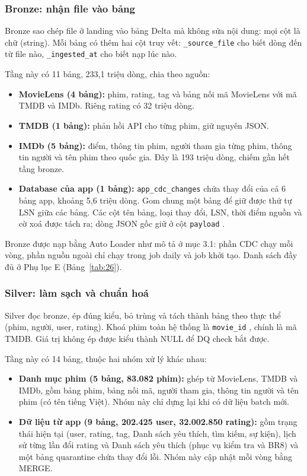 \documentclass[a4paper,11pt]{article}
\newcommand{\dbsep}{\_\allowbreak}
\begin{document}
\subsubsection*{Bronze: nhận file vào bảng}

Bronze sao chép file ở landing vào bảng Delta mà không sửa nội dung: mọi cột là chữ (string). Mỗi bảng có thêm hai cột truy vết: \texttt{\dbsep{}source\dbsep{}file} cho biết dòng đến từ file nào, \texttt{\dbsep{}ingested\dbsep{}at} cho biết nạp lúc nào.

Tầng này có 11 bảng, 233,1 triệu dòng, chia theo nguồn:

\begin{itemize}
  \item \textbf{MovieLens (4 bảng):} phim, rating, tag và bảng nối mã MovieLens với mã TMDB và IMDb. Riêng rating có 32 triệu dòng.
  \item \textbf{TMDB (1 bảng):} phản hồi API cho từng phim, giữ nguyên JSON.
  \item \textbf{IMDb (5 bảng):} điểm, thông tin phim, người tham gia từng phim, thông tin người và tên phim theo quốc gia. Đây là 193 triệu dòng, chiếm gần hết tầng bronze.
  \item \textbf{Database của app (1 bảng):} \texttt{app\dbsep{}cdc\dbsep{}changes} chứa thay đổi của cả 6 bảng app, khoảng 5,6 triệu dòng. Gom chung một bảng để giữ được thứ tự LSN giữa các bảng. Các cột tên bảng, loại thay đổi, LSN, thời điểm nguồn và cờ xoá được tách ra; dòng JSON gốc giữ ở cột \texttt{payload} .
\end{itemize}

Bronze được nạp bằng Auto Loader như mô tả ở mục 3.1: phần CDC chạy mỗi vòng, phần nguồn ngoài chỉ chạy trong job daily và job khởi tạo. Danh sách đầy đủ ở Phụ lục E (Bảng~\ref{tab:26}).

\subsubsection*{Silver: làm sạch và chuẩn hoá}

Silver đọc bronze, ép đúng kiểu, bỏ trùng và tách thành bảng theo thực thể (phim, người, user, rating). Khoá phim toàn hệ thống là \texttt{movie\dbsep{}id} , chính là mã TMDB. Giá trị không ép được kiểu thành NULL để DQ check bắt được.

Tầng này có 14 bảng, thuộc hai nhóm xử lý khác nhau:

\begin{itemize}
  \item \textbf{Danh mục phim (5 bảng, 83.082 phim):} ghép từ MovieLens, TMDB và IMDb, gồm bảng phim, bảng nối mã, người tham gia, thông tin người và tên phim (có tên tiếng Việt). Nhóm này chỉ dựng lại khi có dữ liệu batch mới.
  \item \textbf{Dữ liệu từ app (9 bảng, 202.425 user, 32.002.850 rating):} gồm trạng thái hiện tại (user, rating, tag, Danh sách yêu thích, tìm kiếm, sự kiện), lịch sử từng lần đổi rating và Danh sách yêu thích (phục vụ kiểm tra và BR8) và một bảng quarantine chứa thay đổi lỗi. Nhóm này cập nhật mỗi vòng bằng MERGE.
\end{itemize}
\end{document}
